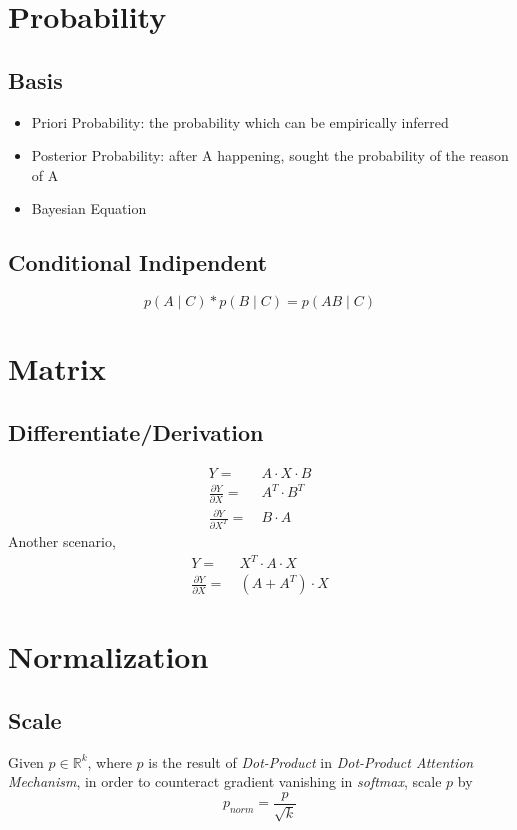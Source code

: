 \documentclass{article}
\begin{document}
    \section{Probability}
    \subsection{Basis}
    \begin{itemize}
        \item Priori Probability: the probability which can be empirically inferred
        \item Posterior Probability: after A happening, sought the probability of the reason of A
        \item Bayesian Equation
    \end{itemize}
    \subsection{Conditional Indipendent}
    \begin{equation*}
        p(A\mid C) * p(B \mid C) = p(AB\mid C)
    \end{equation*}
    \section{Matrix}
    \subsection{Differentiate/Derivation}
    \begin{align*}
        Y=&\  A\cdot X\cdot B\\
        \frac{\partial  Y}{\partial X} =&\ A^{T} \cdot B^{T}\\
        \frac{\partial  Y}{\partial X^{T}} =&\ B \cdot A 
    \end{align*}
    Another scenario,
    \begin{align*}
        Y =&\ X^{T}\cdot A \cdot X\\
        \frac{\partial Y}{\partial X} =&\ (A + A^{T})\cdot X
    \end{align*}
    \section{Normalization}
    \subsection{Scale}
    Given $p\in \mathbb{R}^k$, where $p$ is the result of \emph{Dot-Product} in \emph{Dot-Product Attention Mechanism}, in order to counteract gradient vanishing in \emph{softmax}, scale $p$ by
    \begin{equation*}
        p_{norm} = \frac{p}{\sqrt{k}}
    \end{equation*}
\end{document}
